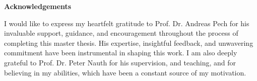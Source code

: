 {%



\begin{titlepage}
	\vspace*{\fill}
	{\Large\textbf{Acknowledgements}\par}\bigskip%
    I would like to express my heartfelt gratitude to Prof. Dr. Andreas Pech for his invaluable support, guidance, and encouragement throughout the process of completing this master thesis. His expertise, insightful feedback, and unwavering commitment have been instrumental in shaping this work. I am also deeply grateful to Prof. Dr. Peter Nauth for his supervision, and teaching, and for believing in my abilities, which have been a constant source of my motivation.
    

\end{titlepage}}
